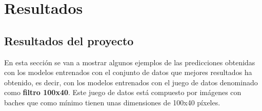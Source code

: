 \section{Resultados}
\label{sec:resultados}

\subsection{Resultados del proyecto}

En esta sección se van a mostrar algunos ejemplos de las predicciones obtenidas con los modelos entrenados con el conjunto de datos que mejores resultados ha obtenido, es decir, con los modelos entrenados con el juego de datos denominado como \textbf{filtro 100x40}. Este juego de datos está compuesto por imágenes con baches que como mínimo tienen unas dimensiones de 100x40 píxeles.


